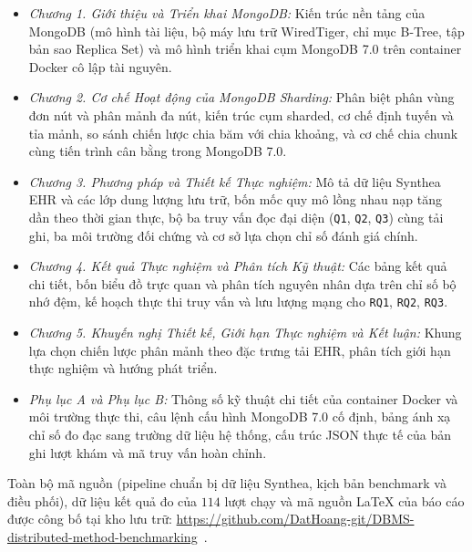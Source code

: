 \begin{itemize}[leftmargin=0.8cm, itemsep=3pt]
  \item \textit{Chương 1. Giới thiệu và Triển khai MongoDB:} Kiến trúc nền tảng của MongoDB (mô hình tài liệu, bộ máy lưu trữ WiredTiger, chỉ mục B-Tree, tập bản sao Replica Set) và mô hình triển khai cụm MongoDB 7.0 trên container Docker cô lập tài nguyên.
  \item \textit{Chương 2. Cơ chế Hoạt động của MongoDB Sharding:} Phân biệt phân vùng đơn nút và phân mảnh đa nút, kiến trúc cụm sharded, cơ chế định tuyến và tỉa mảnh, so sánh chiến lược chia băm với chia khoảng, và cơ chế chia chunk cùng tiến trình cân bằng trong MongoDB 7.0.
  \item \textit{Chương 3. Phương pháp và Thiết kế Thực nghiệm:} Mô tả dữ liệu Synthea EHR và các lớp dung lượng lưu trữ, bốn mốc quy mô lồng nhau nạp tăng dần theo thời gian thực, bộ ba truy vấn đọc đại diện (\texttt{Q1}, \texttt{Q2}, \texttt{Q3}) cùng tải ghi, ba môi trường đối chứng và cơ sở lựa chọn chỉ số đánh giá chính.
  \item \textit{Chương 4. Kết quả Thực nghiệm và Phân tích Kỹ thuật:} Các bảng kết quả chi tiết, bốn biểu đồ trực quan và phân tích nguyên nhân dựa trên chỉ số bộ nhớ đệm, kế hoạch thực thi truy vấn và lưu lượng mạng cho \texttt{RQ1}, \texttt{RQ2}, \texttt{RQ3}.
  \item \textit{Chương 5. Khuyến nghị Thiết kế, Giới hạn Thực nghiệm và Kết luận:} Khung lựa chọn chiến lược phân mảnh theo đặc trưng tải EHR, phân tích giới hạn thực nghiệm và hướng phát triển.
  \item \textit{Phụ lục A và Phụ lục B:} Thông số kỹ thuật chi tiết của container Docker và môi trường thực thi, câu lệnh cấu hình MongoDB 7.0 cố định, bảng ánh xạ chỉ số đo đạc sang trường dữ liệu hệ thống, cấu trúc JSON thực tế của bản ghi lượt khám và mã truy vấn hoàn chỉnh.
\end{itemize}

Toàn bộ mã nguồn (pipeline chuẩn bị dữ liệu Synthea, kịch bản benchmark và điều phối), dữ liệu kết quả đo của $114$ lượt chạy và mã nguồn LaTeX của báo cáo được công bố tại kho lưu trữ: \url{https://github.com/DatHoang-git/DBMS-distributed-method-benchmarking}~\cite{ProjectRepo}.
\FloatBarrier
